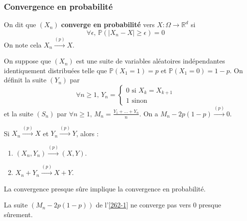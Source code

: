 	\subsubsection{Convergence en probabilité}


	\begin{definition}
		On dit que $(X_n)$ \textbf{converge en probabilité} vers $X : \Omega \rightarrow \mathbb{R}^d$ si
		\[ \forall \epsilon, \, \mathbb{P}(\vert X_n - X \vert \geq \epsilon) = 0 \]
		On note cela $X_n \overset{(p)}{\longrightarrow} X$.
	\end{definition}


	\begin{example}
		\label{262-1}
		On suppose que $(X_n)$ est une suite de variables aléatoires indépendantes identiquement distribuées telle que $\mathbb{P}(X_1 = 1) = p$ et $\mathbb{P}(X_1 = 0) = 1-p$. On définit la suite $(Y_n)$ par
		\[
		\forall n \geq 1, \, Y_n = \begin{cases}
			0 \text{ si } X_k = X_{k+1} \\
			1 \text{ sinon}
		\end{cases}
		\]
		et la suite $(S_n)$ par $\forall n \geq 1, \, M_n = \frac{Y_1 + \dots + Y_n}{n}$. On a $M_n - 2p(1-p) \overset{(p)}{\longrightarrow} 0$.
	\end{example}


	\begin{proposition}
		Si $X_n \overset{(p)}{\longrightarrow} X$ et $Y_n \overset{(p)}{\longrightarrow} Y$, alors :
		\begin{enumerate}[label=(\roman*)]
			\item $(X_n, Y_n) \overset{(p)}{\longrightarrow} (X, Y)$.
			\item $X_n + Y_n \overset{(p)}{\longrightarrow} X + Y$.
		\end{enumerate}
	\end{proposition}

	\begin{theorem}
		La convergence presque sûre implique la convergence en probabilité.
	\end{theorem}


	\begin{cexample}
		La suite $(M_n - 2p(1-p))$ de l'\cref{262-1} ne converge pas vers $0$ presque sûrement.
	\end{cexample}

